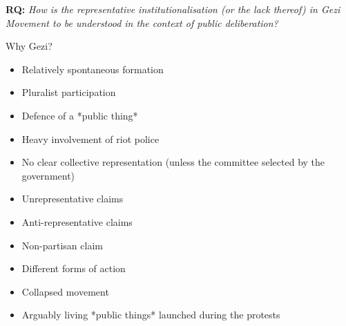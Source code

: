 \documentclass[nobib]{tufte-book}
\theoremstyle{mytheoremstyle}
\theoremstyle{mytheoremstyle}
\theoremstyle{myproblemstyle}
\begin{document}
\textbf{RQ:} \textit{How is the representative institutionalisation (or the lack thereof) in Gezi Movement  to be understood in the context of public deliberation?}

Why Gezi?
\begin{itemize}
  \item Relatively spontaneous formation
  \item Pluralist participation
  \item Defence of a *public thing*
\item Heavy involvement of riot police
\item No clear collective representation (unless the committee selected by the government)
\item Unrepresentative claims
\item Anti-representative claims
\item Non-partisan claim
\item Different forms of action
\item Collapsed movement
\item Arguably living *public things* launched during the protests
\end{itemize}

\printbibliography
\end{document}
